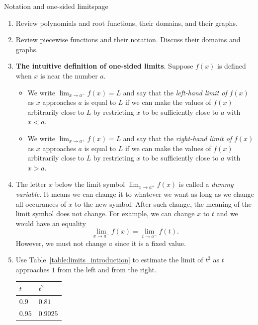 \documentclass[../main.tex]{subfiles}
\begin{document}
\begin{outline}{2.2}{Notation and one-sided limits}{page}
  \label{act:one-sided}
  \begin{enumerate}
    \item Review polynomials and root functions, their domains, and their graphs.
    \item Review piecewise functions and their notation.  Discuss their domains and graphs.
    \item \textbf{The intuitive definition of one-sided limits}. Suppose \(f(x)\) is defined when \(x\) is near the number \(a\).
          \begin{itemize}
            \item We write \(\lim_{x \to a^{-}} f(x) = L\) and say that the \emph{left-hand limit of} \(f(x)\) as \(x\) approaches \(a\) is equal to \(L\) if we can make the values of \(f(x)\) arbitrarily close to \(L\) by restricting \(x\) to be sufficiently close to \(a\) with \(x < a\).
            \item We write \(\lim_{x \to a^{+}} f(x) = L\) and say that the \emph{right-hand limit of} \(f(x)\) as \(x\) approaches \(a\) is equal to \(L\) if we can make the values of \(f(x)\) arbitrarily close to \(L\) by restricting \(x\) to be sufficiently close to \(a\) with \(x > a\).
          \end{itemize}
    \item The letter \(x\) below the limit symbol \(\lim_{x \to a^{+}} f(x)\) is called a \emph{dummy variable}. It means we can change it to whatever we want as long as we change all occurances of \(x\) to the new symbol. After such change, the meaning of the limit symbol does not change. For example, we can change \(x\) to \(t\) and we would have an equality
          \[
            \lim_{x \to a^{-}} f(x) = \lim_{t \to a^{-}} f(t).
          \]
          However, we must not change \(a\) since it is a fixed value.
    \item Use Table~\ref{table:limits_introduction} to estimate the limit of \(t^{2}\) as \(t\) approaches \(1\) from the left and from the right.
          \begin{table}[h]
            \centering
            \begin{tabular}{l | l}
              \(t\)      & \(t^{2}\)  \\
              \midrule
              \(0.9\)    & \(0.81\)   \\
              \(0.95\)   & \(0.9025\) \\

\end{tabular}
\end{table}
\end{enumerate}
\end{outline}
\end{document}
